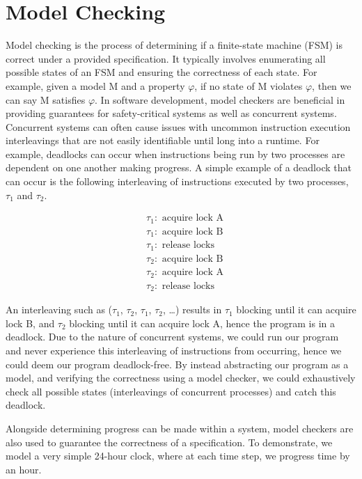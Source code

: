 \section{Model Checking}
Model checking is the process of determining if a finite-state machine (FSM) is correct under a provided specification. It typically involves enumerating all possible states of an FSM and ensuring the correctness of each state. For example, given a model M and a property $\varphi$, if no state of M violates $\varphi$, then we can say M satisfies $\varphi$. In software development, model checkers are beneficial in providing guarantees for safety-critical systems as well as concurrent systems. Concurrent systems can often cause issues with uncommon instruction execution interleavings that are not easily identifiable until long into a runtime. For example, deadlocks can occur when instructions being run by two processes are dependent on one another making progress. A simple example of a deadlock that can occur is the following interleaving of instructions executed by two processes, $\tau_1$ and $\tau_2$. 
\begin{multicols}{2}
    \[
    \begin{aligned}
    & \tau_1: \text{ acquire lock A} \\
    & \tau_1: \text{ acquire lock B} \\
    & \tau_1: \text{ release locks}
    \end{aligned}
    \]
    \vline
    \[
    \begin{aligned}
    & \tau_2: \text{ acquire lock B} \\
    & \tau_2: \text{ acquire lock A} \\
    & \tau_2: \text{ release locks}
    \end{aligned}
    \]
    \end{multicols}
An interleaving such as ($\tau_1$, $\tau_2$, $\tau_1$, $\tau_2$, \dots) results in $\tau_1$ blocking until it can acquire lock B, and $\tau_2$ blocking until it can acquire lock A, hence the program is in a deadlock. Due to the nature of concurrent systems, we could run our program and never experience this interleaving of instructions from occurring, hence we could deem our program deadlock-free. By instead abstracting our program as a model, and verifying the correctness using a model checker, we could exhaustively check all possible states (interleavings of concurrent processes) and catch this deadlock. 
\par
Alongside determining progress can be made within a system, model checkers are also used to guarantee the correctness of a specification. To demonstrate, we model a very simple 24-hour clock, where at each time step, we progress time by an hour.
